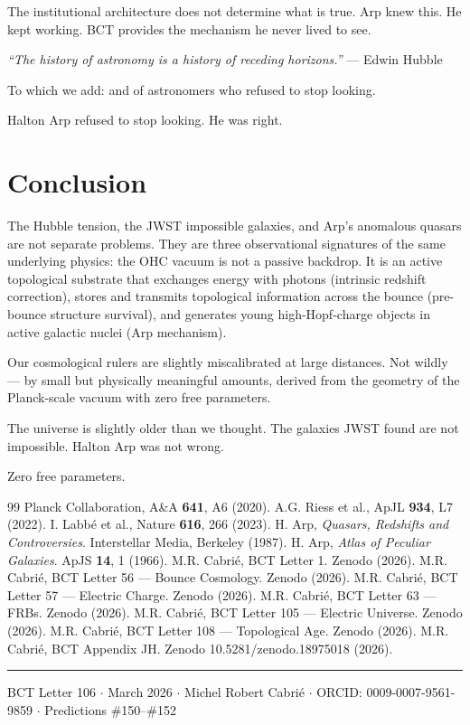 \documentclass[twocolumn,10pt]{article}
\begin{document}
The institutional architecture does not determine what is true.
Arp knew this. He kept working. BCT provides the mechanism he
never lived to see.

\textit{``The history of astronomy is a history of receding horizons.''}
--- Edwin Hubble

To which we add: and of astronomers who refused to stop looking.

Halton Arp refused to stop looking.
He was right.

\section{Conclusion}

The Hubble tension, the JWST impossible galaxies, and Arp's
anomalous quasars are not separate problems. They are three
observational signatures of the same underlying physics: the
OHC vacuum is not a passive backdrop. It is an active topological
substrate that exchanges energy with photons (intrinsic redshift
correction), stores and transmits topological information across
the bounce (pre-bounce structure survival), and generates young
high-Hopf-charge objects in active galactic nuclei (Arp mechanism).

Our cosmological rulers are slightly miscalibrated at large
distances. Not wildly --- by small but physically meaningful
amounts, derived from the geometry of the Planck-scale vacuum
with zero free parameters.

The universe is slightly older than we thought.
The galaxies JWST found are not impossible.
Halton Arp was not wrong.

Zero free parameters.

\begin{thebibliography}{99}
 Planck Collaboration, A\&A \textbf{641}, A6 (2020).
 A.G. Riess et al., ApJL \textbf{934}, L7 (2022).
 I. Labb\'{e} et al., Nature \textbf{616}, 266 (2023).
 H. Arp, \textit{Quasars, Redshifts and Controversies}.
    Interstellar Media, Berkeley (1987).
 H. Arp, \textit{Atlas of Peculiar Galaxies}.
    ApJS \textbf{14}, 1 (1966).
 M.R. Cabri\'{e}, BCT Letter 1. Zenodo (2026).
 M.R. Cabri\'{e}, BCT Letter 56 --- Bounce Cosmology. Zenodo (2026).
 M.R. Cabri\'{e}, BCT Letter 57 --- Electric Charge. Zenodo (2026).
 M.R. Cabri\'{e}, BCT Letter 63 --- FRBs. Zenodo (2026).
 M.R. Cabri\'{e}, BCT Letter 105 --- Electric Universe. Zenodo (2026).
 M.R. Cabri\'{e}, BCT Letter 108 --- Topological Age. Zenodo (2026).
 M.R. Cabri\'{e}, BCT Appendix JH. Zenodo 10.5281/zenodo.18975018 (2026).
\end{thebibliography}

\vspace{8pt}\noindent\rule{\linewidth}{0.4pt}
\small BCT Letter 106 $\cdot$ March 2026 $\cdot$ Michel Robert Cabri\'{e}
$\cdot$ ORCID: 0009-0007-9561-9859 $\cdot$ Predictions \#150--\#152
\end{document}
